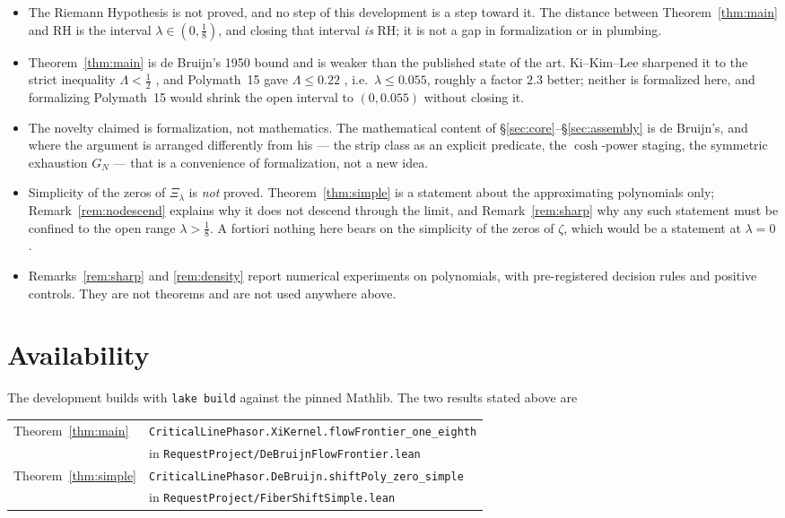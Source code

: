 \documentclass[11pt]{article}
\theoremstyle{definition}
\begin{document}
\begin{itemize}
\item The Riemann Hypothesis is not proved, and no step of this development is a step toward it.  The
  distance between Theorem~\ref{thm:main} and RH is the interval $\lambda\in(0,\tfrac18)$, and closing
  that interval \emph{is} RH; it is not a gap in formalization or in plumbing.
\item Theorem~\ref{thm:main} is de Bruijn's 1950 bound \cite{deBruijn1950} and is weaker than the
  published state of the art.  Ki--Kim--Lee sharpened it to the strict inequality $\Lambda<\tfrac12$
  \cite{KKL2009}, and Polymath~15 gave $\Lambda\le0.22$ \cite{Polymath15}, i.e.\ $\lambda\le0.055$,
  roughly a factor $2.3$ better; neither is formalized here, and formalizing Polymath~15 would shrink
  the open interval to $(0,0.055)$ without closing it.
\item The novelty claimed is formalization, not mathematics.  The mathematical content of
  \S\ref{sec:core}--\S\ref{sec:assembly} is de Bruijn's, and where the argument is arranged differently
  from his --- the strip class as an explicit predicate, the $\cosh$-power staging, the symmetric
  exhaustion $G_N$ --- that is a convenience of formalization, not a new idea.
\item Simplicity of the zeros of $\Xi_\lambda$ is \emph{not} proved.  Theorem~\ref{thm:simple} is a
  statement about the approximating polynomials only; Remark~\ref{rem:nodescend} explains why it does
  not descend through the limit, and Remark~\ref{rem:sharp} why any such statement must be confined to
  the open range $\lambda>\tfrac18$.  A fortiori nothing here bears on the simplicity of the zeros of
  $\zeta$, which would be a statement at $\lambda=0$.
\item Remarks~\ref{rem:sharp} and \ref{rem:density} report numerical experiments on polynomials, with
  pre-registered decision rules and positive controls.  They are not theorems and are not used
  anywhere above.
\end{itemize}

\section*{Availability}

The development builds with \texttt{lake build} against the pinned Mathlib.  The two results stated
above are
\begin{center}
\begin{tabular}{ll}
Theorem~\ref{thm:main} & \texttt{CriticalLinePhasor.XiKernel.flowFrontier\_one\_eighth} \\
  & in \texttt{RequestProject/DeBruijnFlowFrontier.lean} \\[2pt]
Theorem~\ref{thm:simple} & \texttt{CriticalLinePhasor.DeBruijn.shiftPoly\_zero\_simple} \\
  & in \texttt{RequestProject/FiberShiftSimple.lean}
\end{tabular}
\end{center}
\end{document}
